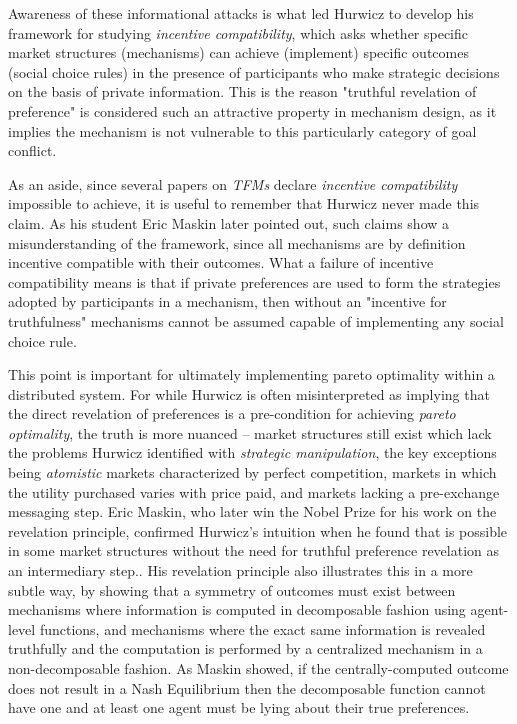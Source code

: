 \documentclass[sigconf,anonymous]{aamas}
\begin{document}
Awareness of these informational attacks is what led Hurwicz to develop his framework for studying \textit{incentive compatibility}, which asks whether specific market structures (mechanisms) can achieve (implement) specific outcomes (social choice rules) in the presence of participants who make strategic decisions on the basis of private information. This is the reason "truthful revelation of preference" is considered such an attractive property in mechanism design, as it implies the mechanism is not vulnerable to this particularly category of goal conflict.

As an aside, since several papers on \textit{TFMs} declare \textit{incentive compatibility} impossible to achieve, it is useful to remember that Hurwicz never made this claim. As his student Eric Maskin later pointed out, such claims show a misunderstanding of the framework, since all mechanisms are by definition incentive compatible with their outcomes. What a failure of incentive compatibility means is that if private preferences are used to form the strategies adopted by participants in a mechanism, then without an "incentive for truthfulness" mechanisms cannot be assumed capable of implementing any social choice rule. 

This point is important for ultimately implementing {pareto optimality} within a distributed system. For while Hurwicz is often misinterpreted as implying that the direct revelation of preferences is a pre-condition for achieving \textit{pareto optimality}, the truth is more nuanced -- market structures still exist which lack the problems Hurwicz identified with \textit{strategic manipulation}, the key exceptions being \textit{atomistic} markets characterized by perfect competition, markets in which the utility purchased varies with price paid, and markets lacking a pre-exchange messaging step. Eric Maskin, who later win the Nobel Prize for his work on the revelation principle, confirmed Hurwicz's intuition when he found that  is possible in some market structures without the need for truthful preference revelation as an intermediary step.\citet{maskin1999nash}. His revelation principle also illustrates this in a more subtle way, by showing that a symmetry of outcomes must exist between mechanisms where information is computed in decomposable fashion using agent-level functions, and mechanisms where the exact same information is revealed truthfully and the computation is performed by a centralized mechanism in a non-decomposable fashion. As Maskin showed, if the centrally-computed outcome does not result in a Nash Equilibrium then the decomposable function cannot have one and at least one agent must be lying about their true preferences.
\end{document}
